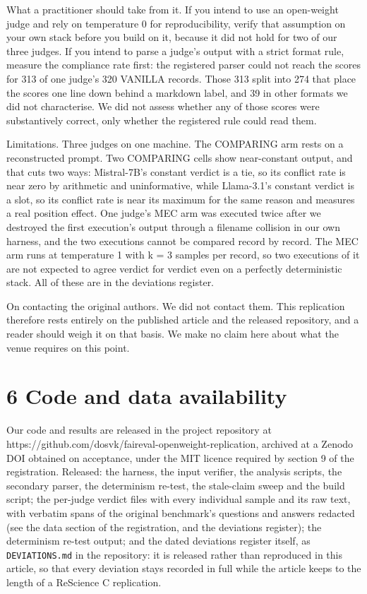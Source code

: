 What a practitioner should take from it. If you intend to use an open-weight judge and rely on
temperature 0 for reproducibility, verify that assumption on your own stack before you build on it,
because it did not hold for two of our three judges. If you intend to parse a judge's output with a
strict format rule, measure the compliance rate first: the registered parser could not reach the
scores for 313 of one judge's 320 VANILLA records. Those 313 split into 274 that place the scores one
line down behind a markdown label, and 39 in other formats we did not characterise. We did not
assess whether any of those scores were substantively correct, only whether the registered rule
could read them.

Limitations. Three judges on one machine. The COMPARING arm rests on a reconstructed prompt.
Two COMPARING cells show near-constant output, and that cuts two ways: Mistral-7B's constant
verdict is a tie, so its conflict rate is near zero by arithmetic and uninformative, while
Llama-3.1's constant verdict is a slot, so its conflict rate is near its maximum for the same
reason and measures a real position effect. One judge's
MEC arm was executed twice after we destroyed the first execution's output through a filename
collision in our own harness, and the two executions cannot be compared record by record. The MEC
arm runs at temperature 1 with k = 3 samples per record, so two executions of it are not expected to
agree verdict for verdict even on a perfectly deterministic stack. All of these are
in the deviations register.

On contacting the original authors. We did not contact them. This replication therefore rests
entirely on the published article and the released repository, and a reader should weigh it on
that basis. We make no claim here about what the venue requires on this point.

\section{6 Code and data availability}\label{code-and-data-availability}

Our code and results are released in the project repository at https://github.com/dosvk/faireval-openweight-replication, archived at a Zenodo DOI obtained on acceptance, under the MIT licence required by section 9
of the registration. Released: the harness, the input verifier, the analysis scripts,
the secondary parser, the determinism re-test, the stale-claim sweep and the build script; the
per-judge verdict files with every individual sample and its raw text, with verbatim spans of
the original benchmark's questions and answers redacted (see the data section of the
registration, and the deviations register); the determinism re-test
output; and the dated deviations register itself, as \texttt{DEVIATIONS.md} in the repository: it is released
rather than reproduced in this article, so that every deviation stays recorded in full while
the article keeps to the length of a ReScience C replication.

